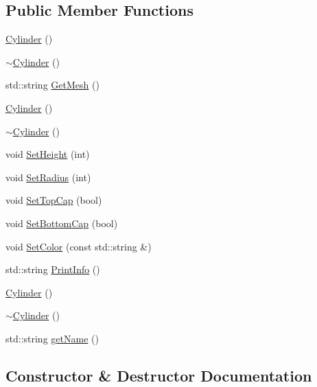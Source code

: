 \subsection*{Public Member Functions}
\begin{DoxyCompactItemize}
\item 
\mbox{\hyperlink{class_cylinder_a01dc978cb576f834b9545e43d4dad2a2}{Cylinder}} ()
\item 
\mbox{\hyperlink{class_cylinder_a05ab556f0ae3cd6e99d9d1f3caca80b3}{$\sim$\+Cylinder}} ()
\item 
std\+::string \mbox{\hyperlink{class_cylinder_adada3adc010fbd6530969b3f7845c727}{Get\+Mesh}} ()
\item 
\mbox{\hyperlink{class_cylinder_a01dc978cb576f834b9545e43d4dad2a2}{Cylinder}} ()
\item 
\mbox{\hyperlink{class_cylinder_a05ab556f0ae3cd6e99d9d1f3caca80b3}{$\sim$\+Cylinder}} ()
\item 
void \mbox{\hyperlink{class_cylinder_a269bbf0d359b586a9f0bd214e26109f4}{Set\+Height}} (int)
\item 
void \mbox{\hyperlink{class_cylinder_a6154587e13ab550cf3542188231957c5}{Set\+Radius}} (int)
\item 
void \mbox{\hyperlink{class_cylinder_a7c0f84cbfad4dda30a663a48858c70ea}{Set\+Top\+Cap}} (bool)
\item 
void \mbox{\hyperlink{class_cylinder_aacc8158ba918eed167fbfd43eadfe1b0}{Set\+Bottom\+Cap}} (bool)
\item 
void \mbox{\hyperlink{class_cylinder_a314d27ef3a15767f8c4ff538827c9a4a}{Set\+Color}} (const std\+::string \&)
\item 
std\+::string \mbox{\hyperlink{class_cylinder_ac61439519f076123be2ec3550ad34971}{Print\+Info}} ()
\item 
\mbox{\hyperlink{class_cylinder_a01dc978cb576f834b9545e43d4dad2a2}{Cylinder}} ()
\item 
\mbox{\hyperlink{class_cylinder_a05ab556f0ae3cd6e99d9d1f3caca80b3}{$\sim$\+Cylinder}} ()
\item 
std\+::string \mbox{\hyperlink{class_cylinder_afdb7f76b3f02471d638c36127395d181}{get\+Name}} ()
\end{DoxyCompactItemize}


\subsection{Constructor \& Destructor Documentation}
\mbox{\label{class_cylinder_a01dc978cb576f834b9545e43d4dad2a2}} 
